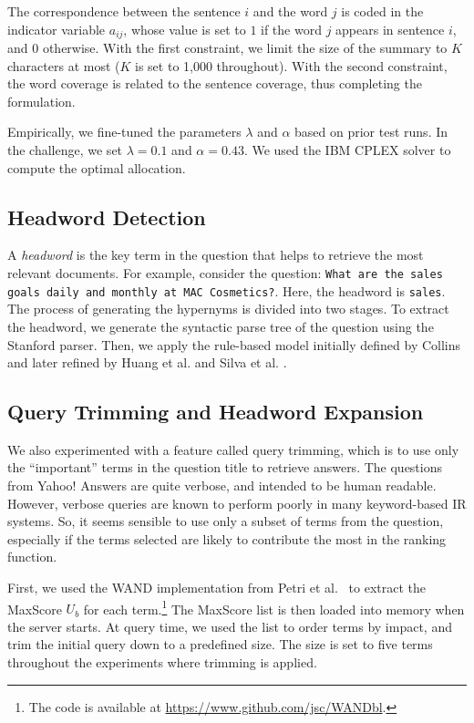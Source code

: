 \documentclass[a4paper,10pt,conference,compsocconf,final]{IEEEtran}
\begin{document}
{{{{The correspondence between the sentence $i$ and the word $j$ is coded in the
indicator variable $a_{ij}$, whose value is set to $1$ if the word $j$ appears
in sentence $i$, and $0$ otherwise.  With the first constraint, we limit the
size of the summary to $K$ characters at most ($K$ is set to 1,000 throughout).
With the second constraint, the word coverage is related to the sentence
coverage, thus completing the formulation.

Empirically, we fine-tuned the parameters $\lambda$ and $\alpha$ based on prior
test runs.  In the challenge, we set $\lambda = 0.1$ and $\alpha = 0.43$.  We
used the IBM CPLEX solver to compute the optimal allocation.




\subsection{Headword Detection}
\label{sec:head}

A {\em headword} is the key term in the question that helps
to retrieve the most relevant documents.
For example, consider the question: {\tt What are the sales
goals daily and monthly at MAC Cosmetics?}.
Here, the headword is {\tt sales}.
The process of generating the hypernyms is divided into two stages.
To extract the headword, we generate the syntactic parse tree of the
question using the Stanford parser.
Then, we apply the rule-based model initially defined by Collins
\cite{collins2003head} and later refined by Huang et al.
\cite{huang2008question} and Silva et al. \cite{silva2011symbolic}.



\subsection{Query Trimming and Headword Expansion}
\label{sec:redexp}

We also experimented with a feature called query trimming, which is to use
only the ``important'' terms in the question title to retrieve
answers.
The questions from Yahoo! Answers are quite verbose, and intended 
to be human readable.
However, verbose queries are known to perform poorly in many keyword-based
IR systems.
So, it seems sensible to use only a subset of terms from the question,
especially if the terms selected are likely to contribute the most in the
ranking function.

First, we used the WAND implementation from Petri et
al.~\cite{petri2013exploring,petri2014score} to extract the MaxScore
$U_b$ for each term.\footnote{The code is available at
\url{https://www.github.com/jsc/WANDbl}.}
The MaxScore list is then loaded into memory when the server starts.
At query time, we used the list to order terms by impact, and trim the
initial query down to a predefined size.
The size is set to five terms throughout the experiments where trimming
is applied.

}}}}
\end{document}
